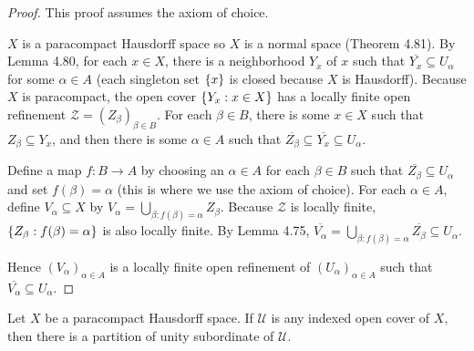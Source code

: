 \begin{proof}
	This proof assumes the axiom of choice.

	$X$ is a paracompact Hausdorff space so $X$ is a normal space (Theorem 4.81). By Lemma 4.80, for each $x\in X$, there is a neighborhood $Y_{x}$ of $x$ such that $\overline{Y_{x}} \subseteq U_{\alpha}$ for some $\alpha\in A$ (each singleton set $\left\{{x}\right\}$ is closed because $X$ is Hausdorff). Because $X$ is paracompact, the open cover $\left\{{ Y_{x} : x\in X }\right\}$ has a locally finite open refinement $\mathcal{Z} = {(Z_{\beta})}_{\beta\in B}$. For each $\beta\in B$, there is some $x\in X$ such that $Z_{\beta} \subseteq Y_{x}$, and then there is some $\alpha\in A$ such that $\overline{Z_{\beta}} \subseteq \overline{Y_{x}} \subseteq U_{\alpha}$.

	Define a map $f: B\to A$ by choosing an $\alpha\in A$ for each $\beta\in B$ such that $\overline{Z_{\beta}} \subseteq U_{\alpha}$ and set $f(\beta) = \alpha$ (this is where we use the axiom of choice). For each $\alpha\in A$, define $V_{\alpha} \subseteq X$ by $V_{\alpha} = \bigcup_{\beta : f(\beta) = \alpha} Z_{\beta}$. Because $\mathcal{Z}$ is locally finite, $\left\{{ Z_{\beta} : f(\beta) = \alpha }\right\}$ is also locally finite. By Lemma 4.75, $\overline{V_{\alpha}} = \bigcup_{\beta: f(\beta) = \alpha}\overline{Z_{\beta}} \subseteq U_{\alpha}$.

	Hence ${(V_{\alpha})}_{\alpha\in A}$ is a locally finite open refinement of ${(U_{\alpha})}_{\alpha\in A}$ such that $\overline{V_{\alpha}} \subseteq U_{\alpha}$.
\end{proof}

\begin{theorem}{4.85}
	Let $X$ be a paracompact Hausdorff space. If $\mathscr{U}$ is any indexed open cover of $X$, then there is a partition of unity subordinate of $\mathscr{U}$.
\end{theorem}

